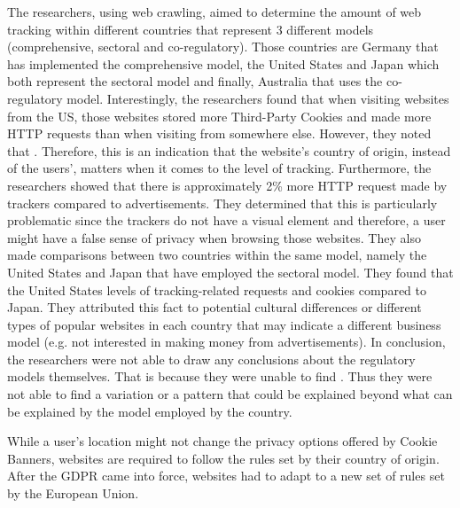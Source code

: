 \documentclass[../main.tex]{subfiles}
\begin{document}
The researchers, using web crawling, aimed to determine the amount of web tracking within different countries that represent 3 different models (comprehensive, sectoral and co-regulatory). Those countries are Germany that has implemented the comprehensive model, the United States and Japan which both represent the sectoral model and finally, Australia that uses the co-regulatory model. Interestingly, the researchers found that when visiting websites from the US, those websites stored more Third-Party Cookies and made more HTTP requests than when visiting from somewhere else. However, they noted that . Therefore, this is an indication that the website’s country of origin, instead of the users’, matters when it comes to the level of tracking. Furthermore, the researchers showed that there is approximately 2\% more HTTP request made by trackers compared to advertisements. They determined that this is particularly problematic since the trackers do not have a visual element and therefore, a user might have a false sense of privacy when browsing those websites. They also made comparisons between two countries within the same model, namely the United States and Japan that have employed the sectoral model. They found that the United States  levels of tracking-related requests and cookies compared to Japan. They attributed this fact to potential cultural differences or different types of popular websites in each country that may indicate a different business model (e.g. not interested in making money from advertisements). In conclusion, the researchers were not able to draw any conclusions about the regulatory models themselves. That is because they were unable to find . Thus they were not able to find a variation or a pattern that could be explained beyond what can be explained by the model employed by the country. 

While a user’s location might not change the privacy options offered by Cookie Banners, websites are required to follow the rules set by their country of origin. After the GDPR came into force, websites had to adapt to a new set of rules set by the European Union. 
\end{document}
